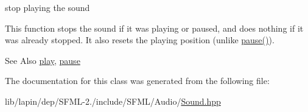stop playing the sound 

This function stops the sound if it was playing or paused, and does nothing if it was already stopped. It also resets the playing position (unlike \hyperlink{classsf_1_1_sound_a5eeb25815bfa8cdc4a6cc000b7b19ad5}{pause()}).

\begin{DoxySeeAlso}{See Also}
\hyperlink{classsf_1_1_sound_a2953ffe632536e72e696fd880ced2532}{play}, \hyperlink{classsf_1_1_sound_a5eeb25815bfa8cdc4a6cc000b7b19ad5}{pause} 
\end{DoxySeeAlso}


The documentation for this class was generated from the following file\-:\begin{DoxyCompactItemize}
\item 
lib/lapin/dep/\-S\-F\-M\-L-\/2./include/\-S\-F\-M\-L/\-Audio/\hyperlink{lib_2lapin_2dep_2_s_f_m_l-2_83_2include_2_s_f_m_l_2_audio_2_sound_8hpp}{Sound.\-hpp}\end{DoxyCompactItemize}
